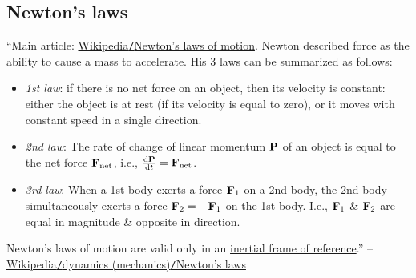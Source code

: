 \documentclass{article}
\begin{document}
\subsection{Newton's laws}
``Main article: \href{https://en.wikipedia.org/wiki/Newton%27s_laws_of_motion}{Wikipedia\texttt{/}Newton's laws of motion}. Newton described force as the ability to cause a mass to accelerate. His 3 laws can be summarized as follows:
\begin{itemize}
	\item {\it 1st law}: if there is no net force on an object, then its velocity is constant: either the object is at rest (if its velocity is equal to zero), or it moves with constant speed in a single direction.
	\item {\it 2nd law}: The rate of change of linear momentum ${\bf P}$ of an object is equal to the net force ${\bf F}_{\rm net}$, i.e., $\frac{{\rm d}{\bf P}}{{\rm d}t} = {\bf F}_{\rm net}$.
	\item {\it 3rd law}: When a 1st body exerts a force ${\bf F}_1$ on a 2nd body, the 2nd body simultaneously exerts a force ${\bf F}_2 = -{\bf F}_1$ on the 1st body. I.e., ${\bf F}_1$ \& ${\bf F}_2$ are equal in magnitude \& opposite in direction.
\end{itemize}
Newton's laws of motion are valid only in an \href{https://en.wikipedia.org/wiki/Inertial_frame_of_reference}{inertial frame of reference}.'' -- \href{https://en.wikipedia.org/wiki/Dynamics_(mechanics)#Newton's_laws}{Wikipedia\texttt{/}dynamics (mechanics)\texttt{/}Newton's laws}

\end{document}
